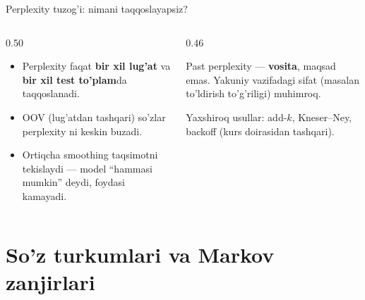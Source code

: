 \documentclass[aspectratio=169,11pt]{beamer}
\begin{document}
\begin{frame}{Perplexity tuzog'i: nimani taqqoslayapsiz?}
  \begin{columns}[T]
    \begin{column}{0.50\textwidth}
      \begin{tcolorbox}[warnbox,title=Cheklovlar]
        \small
        \begin{itemize}\setlength\itemsep{2pt}
          \item Perplexity faqat \textbf{bir xil lug'at} va \textbf{bir xil test
                to'plam}da taqqoslanadi.
          \item OOV (lug'atdan tashqari) so'zlar perplexity ni keskin buzadi.
          \item Ortiqcha smoothing taqsimotni tekislaydi --- model
                ``hammasi mumkin'' deydi, foydasi kamayadi.
        \end{itemize}
      \end{tcolorbox}
    \end{column}
    \begin{column}{0.46\textwidth}
      \begin{tcolorbox}[okbox,top=2pt,bottom=2pt]
        \footnotesize
        Past perplexity --- \textbf{vosita}, maqsad emas. Yakuniy vazifadagi
        sifat (masalan to'ldirish to'g'riligi) muhimroq.
      \end{tcolorbox}
      \vspace{3pt}
      \footnotesize\color{halfgray}
      Yaxshiroq usullar: add-$k$, Kneser--Ney, backoff (kurs doirasidan tashqari).
    \end{column}
  \end{columns}
\end{frame}

\section[POS]{So'z turkumlari va Markov zanjirlari}
\end{document}
